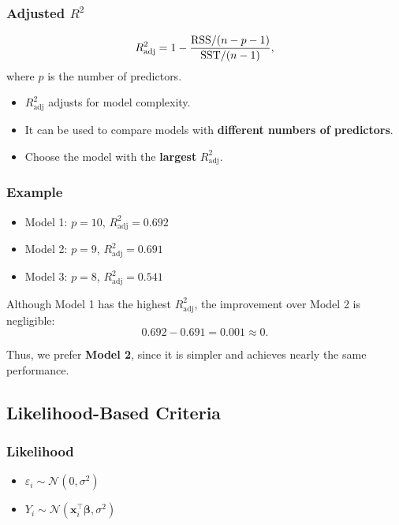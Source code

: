 \subsubsection*{Adjusted $R^2$}

\begin{keyresult}
\[
R^2_{\text{adj}} = 1 - \frac{\mathrm{RSS}/(n - p - 1)}{\mathrm{SST}/(n - 1)},
\]
where $p$ is the number of predictors.

\begin{itemize}
\item $R^2_{\text{adj}}$ adjusts for model complexity.
\item It can be used to compare models with \textbf{different numbers of predictors}.
\item Choose the model with the \textbf{largest} $R^2_{\text{adj}}$.
\end{itemize}
\end{keyresult}

\subsubsection*{Example}

\begin{itemize}
\item Model 1: $p = 10$, \quad $R^2_{\text{adj}} = 0.692$
\item Model 2: $p = 9$, \quad $R^2_{\text{adj}} = 0.691$
\item Model 3: $p = 8$, \quad $R^2_{\text{adj}} = 0.541$
\end{itemize}

Although Model 1 has the highest $R^2_{\text{adj}}$, the improvement over Model 2 is negligible:
\[
0.692 - 0.691 = 0.001 \approx 0.
\]

Thus, we prefer \textbf{Model 2}, since it is simpler and achieves nearly the same performance.

\clearpage

\subsection{Likelihood-Based Criteria}

\subsubsection*{Likelihood}

\begin{itemize}
\item $\varepsilon_i \sim \mathcal{N}(0, \sigma^2)$
\item $Y_i \sim \mathcal{N}(\mathbf{x}_i^\top \boldsymbol{\beta}, \sigma^2)$
\end{itemize}

